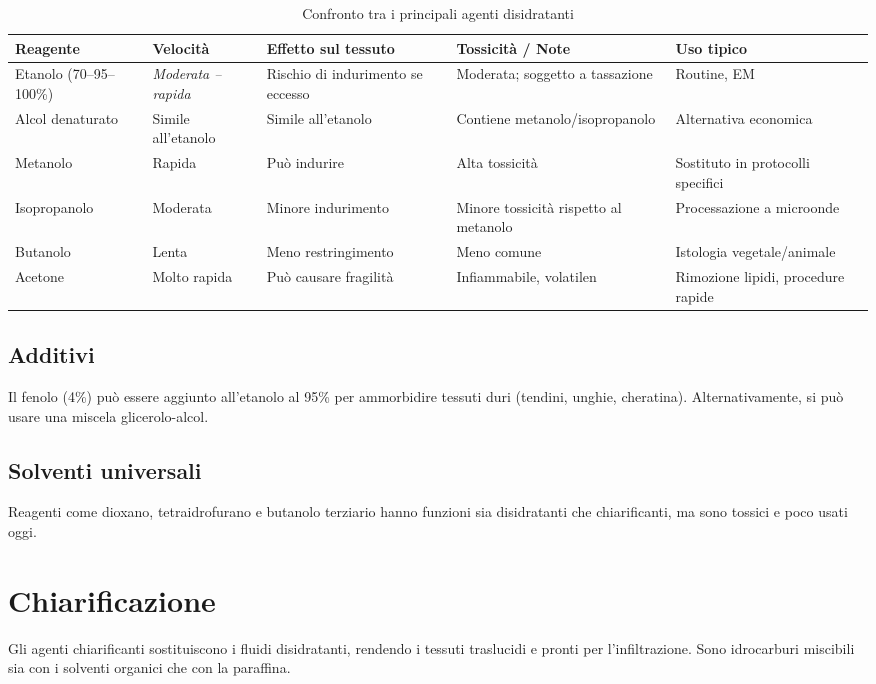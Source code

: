 \begin{table}[htbp]
  \centering
  \caption{Confronto tra i principali agenti disidratanti}
  \label{tab:disidratanti}
  \begin{adjustbox}{max width=\textwidth}
  \begin{tabular}{@{}lllll@{}}
    \toprule
    \textbf{Reagente} & \textbf{Velocità} & \textbf{Effetto sul tessuto} & \textbf{Tossicità / Note} & \textbf{Uso tipico} \\
    \midrule
    Etanolo (70--95--100\%) & \emph{Moderata -- rapida} & Rischio di indurimento se eccesso & Moderata; soggetto a tassazione & Routine, EM \\
    Alcol denaturato & Simile all'etanolo & Simile all'etanolo & Contiene metanolo/isopropanolo & Alternativa economica \\
    Metanolo & Rapida & Può indurire & Alta tossicità & Sostituto in protocolli specifici \\
    Isopropanolo & Moderata & Minore indurimento & Minore tossicità rispetto al metanolo & Processazione a microonde \\
    Butanolo & Lenta & Meno restringimento & Meno comune & Istologia vegetale/animale \\
    Acetone & Molto rapida & Può causare fragilità & Infiammabile, volatilen & Rimozione lipidi, procedure rapide \\
    \bottomrule
  \end{tabular}
  \end{adjustbox}
\end{table}

\subsection{Additivi}
Il fenolo (4\%) può essere aggiunto all’etanolo al 95\% per ammorbidire tessuti duri (tendini, unghie, cheratina). Alternativamente, si può usare una miscela glicerolo-alcol.

\subsection{Solventi universali}
Reagenti come dioxano, tetraidrofurano e butanolo terziario hanno funzioni sia disidratanti che chiarificanti, ma sono tossici e poco usati oggi.



\section{Chiarificazione}
Gli agenti chiarificanti sostituiscono i fluidi disidratanti, rendendo i tessuti traslucidi e pronti per l’infiltrazione. Sono idrocarburi miscibili sia con i solventi organici che con la paraffina.

